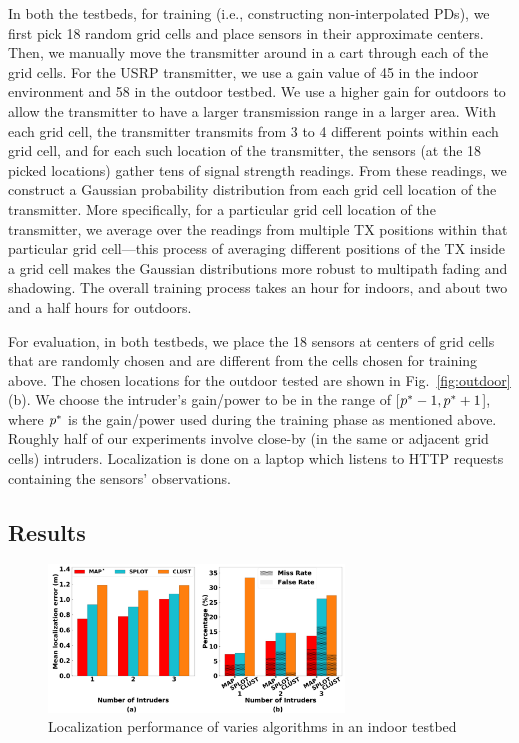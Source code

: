  In both the testbeds, for training (i.e.,
constructing non-interpolated PDs), we first pick 18 random grid cells
and place sensors in their approximate centers. Then, we manually move
the transmitter around in a cart through each of the grid cells. For
the USRP transmitter, we use a gain value of 45 in the indoor
environment and 58 in the outdoor testbed. We use a higher gain for
outdoors to allow the transmitter to have a larger transmission range
in a larger area.
With each grid cell, the transmitter transmits from 3 to 4 different
points within each grid cell, and for each such location of the
transmitter, the sensors (at the 18 picked locations) gather tens of
signal strength readings. From these readings, we construct a Gaussian
probability distribution from each grid cell location of the
transmitter.
More specifically, for a particular grid cell location of the
transmitter, we average over the readings from multiple TX positions
within that particular grid cell---this process of averaging different
positions of the TX inside a grid cell makes the Gaussian
distributions more robust to multipath fading and shadowing. The
overall training process takes an hour for indoors, and about two and
a half hours for outdoors.

  For evaluation, in both testbeds, we place the 18
sensors at centers of grid cells that are randomly chosen and are
different from the cells chosen for training above. The chosen
locations for the outdoor tested are shown in
Fig.~\ref{fig:outdoor}(b). We choose the intruder's gain/power to be
in the range of [$p^*-1, p^*+1$], where $p^*$ is the
gain/power used during the training phase as mentioned above.
Roughly half of our experiments involve close-by (in the same or
adjacent grid cells) intruders. Localization is done on a laptop which
listens to HTTP requests containing the sensors' observations. 

\subsection{Results}

\begin{figure}
	\centering
	\includegraphics[width=0.7\textwidth]{chapters/ipsn/figures/indoor-error-missfalse.png}
	\caption{Localization performance of varies algorithms in an indoor testbed}
	\label{fig:indoor-error-miss-false}
\end{figure}

